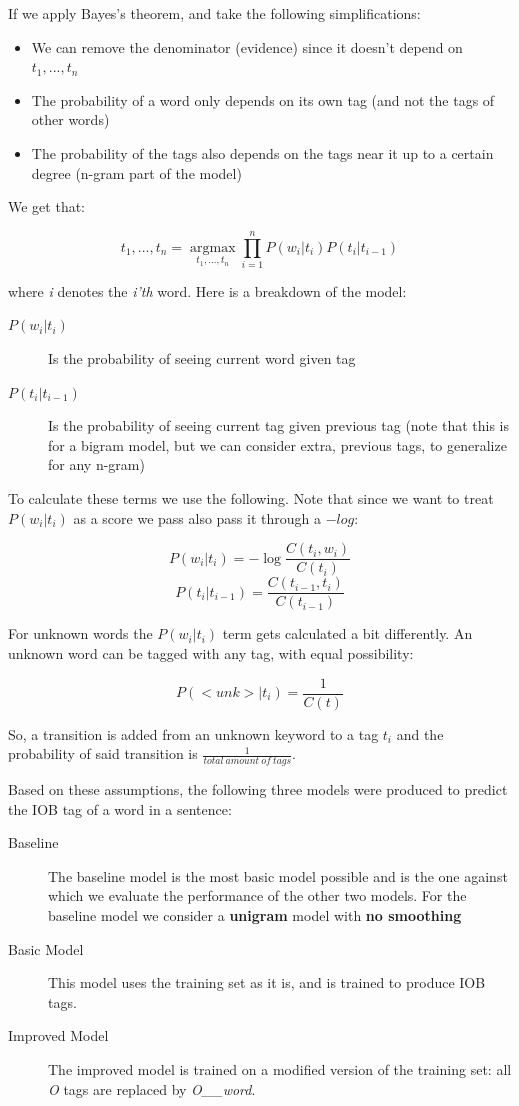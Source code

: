 \documentclass[11pt,a4paper]{article}
\begin{document}
	If we apply Bayes's theorem, and take the following simplifications:
	
	\begin{itemize}
		\item We can remove the denominator (evidence) since it doesn't depend on $t_1,...,t_n$
		\item The probability of a word only depends on its own tag (and not the tags of other words)
		\item The probability of the tags also depends on the tags near it up to a certain degree (n-gram part of the model)
	\end{itemize}
	
	We get that:
	
	$$
	 t_1, ... , t_n = \operatorname*{argmax}_{t_1,...,t_n} 
	 \prod_{i=1}^{n} P(w_i | t_i) P(t_i | t_{i-1})
	$$

	where \textit{i} denotes the \textit{i'th} word. Here is a breakdown of the model:
	
	\begin{description}
		\item[$P(w_i|t_i)$] Is the probability of seeing current word given tag
		\item[$P(t_i|t_{i-1})$] Is the probability of seeing current tag given previous tag (note that this is for a bigram model, but we can consider extra, previous tags, to generalize for any n-gram)
	\end{description}
	
	To calculate these terms we use the following. Note that since we want to treat $P(w_i|t_i)$ as a score we pass also pass it through a $-log$:
	
	$$
	P(w_i|t_i) = -\log \frac{C(t_i, w_i)}{C(t_i)}
	$$
	$$
	P(t_i|t_{i-1}) = \frac{C(t_{i-1}, t_i)}{C(t_{i-1})}
	$$
	
	For unknown words the $P(w_i|t_i)$ term gets calculated a bit differently. An unknown word can be tagged with any tag, with equal possibility:
	
	$$
	P(<unk>|t_i) = \frac{1}{C(t)}
	$$
	
	So, a transition is added from an unknown keyword to a tag $t_i$ and the probability of said transition is $\frac{1}{total\ amount\ of\ tags}$.
	
	Based on these assumptions, the following three models were produced to predict the IOB tag of a word in a sentence:
	
	\begin{description}
		\item[Baseline] The baseline model is the most basic model possible and is the one against which we evaluate the performance of the other two models. For the baseline model we consider a \textbf{unigram} model with \textbf{no smoothing}
		\item[Basic
		 Model] This model uses the training set as it is, and is trained to produce IOB tags. 
		\item[Improved Model] The improved model is trained on a modified version of the training set: all \textit{O} tags are replaced by \textit{O\_\_word}. 
	\end{description}
\end{document}
